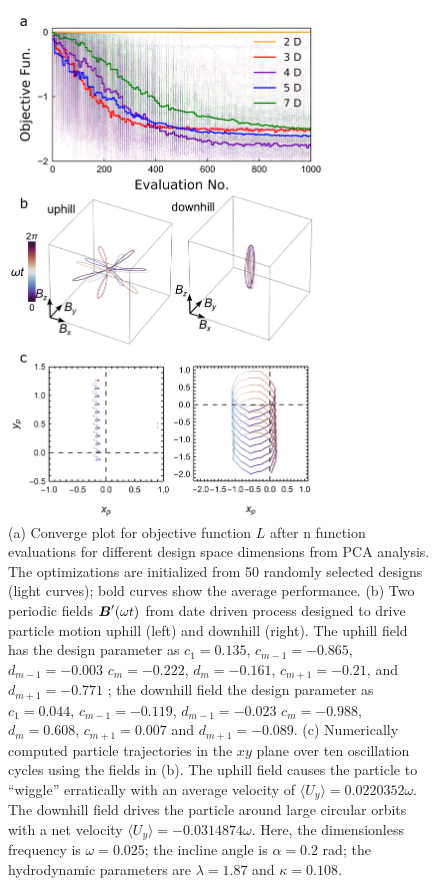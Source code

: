 \begin{figure}[h!]
    \centering
    \includegraphics[width=8.5cm]{figures/converge.png}
    \caption{(a) Converge plot for objective function $L$  after n function evaluations for different design space dimensions from PCA analysis. The optimizations are  initialized from 50 randomly selected designs (light curves); bold curves show the average performance. (b) Two periodic fields $\boldsymbol{B}'(\omega t)$ from date driven process designed to drive particle motion uphill (left) and downhill (right).  The uphill field has the design parameter as $c_1=0.135$, $c_{m-1}=-0.865$, $d_{m-1}=-0.003$ $c_{m}=-0.222$, $d_{m}=-0.161$, $c_{m+1}=-0.21$, and $d_{m+1}=-0.771$ ; the downhill field the design parameter as $c_1=0.044$, $c_{m-1}=-0.119$, $d_{m-1}=-0.023$ $c_{m}=-0.988$, $d_{m}=0.608$, $c_{m+1}=0.007$ and $d_{m+1}= -0.089$. (c) Numerically computed particle trajectories in the $xy$ plane over ten oscillation cycles using the fields in (b). The uphill field causes the particle to ``wiggle'' erratically with an average velocity of $\langle U_y\rangle = 0.0220352 \omega$. The downhill field drives the particle around large circular orbits with a net velocity $\langle U_y\rangle = -0.0314874\omega$. Here, the dimensionless frequency is $\omega=0.025$; the incline angle is $\alpha=0.2$ rad; the hydrodynamic parameters are $\lambda=1.87$ and $\kappa=0.108$. }
    \label{fig:cma-es}
\end{figure}

